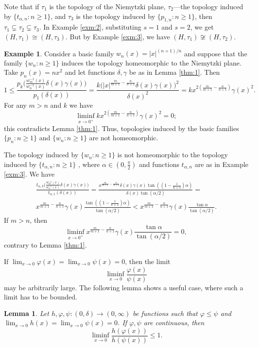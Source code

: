 \documentclass[a4paper,12pt,leqno]{amsart}
\renewcommand{\phi}{\varphi}
\newtheorem{lem}[thm]{Lemma}
\theoremstyle{definition}
\newtheorem{exm}{Example}
\renewcommand{\geq}{\geqslant}
\renewcommand{\leq}{\leqslant}
\begin{document}
Note that if $\tau_1$ is the topology of the Niemytzki plane, $\tau_2$---the topology induced by  $\{t_{\alpha,n}\colon n\geq1\}$, and $\tau_3$ is the topology induced by $\{p_{1,n}\colon n\geq1\}$, then $\tau_1\subsetneq\tau_2\subsetneq \tau_3$.
In Example \ref{exm:2}, substituting $s=1$ and $s=2$, we get $(H,\tau_1)\cong (H,\tau_3)$.
But by Example \ref{exm:3}, we have $(H,\tau_1)\not\cong(H,\tau_2)$.

\begin{exm}
  Consider a basic family $w_n(x)=|x|^{(n+1)/n}$ and  suppose that the family $\{w_n\colon n\geq 1\}$ induces the topology homeomorphic to the Niemytzki plane.
Take  $p_n(x)=nx^2$ and let functions $\delta,\gamma$ be as in Lemma \ref{thm:1}.
 Then $$1\leq\frac{p_k\big(\frac{w_m^{-1}(x)}{w_n^{-1}(x)}\delta(x)\gamma(x)\big)}{p_1(\delta(x))}=\frac{k\big(|x|^{\frac m{m+1}-\frac n{n+1}}\delta(x)\gamma(x)\big)^2}{\delta(x)^2}=kx^{2(\frac m{m+1}-\frac n{n+1})}\gamma(x)^2.$$
 For any $m>n$ and $k$ we have
 $$\liminf_{x\to 0^+}kx^{2(\frac m{m+1}-\frac n{n+1})}\gamma(x)^2=0;$$
 this contradicts Lemma \ref{thm:1}.
 Thus, topologies induced by the basic families $\{p_n\colon n\geq 1\}$ and $\{w_n\colon n\geq 1\}$ are not homeomorphic.
 
 The topology induced by $\{w_n\colon n\geq 1\}$ is not homeomorphic to the topology induced by $\{t_{\alpha,n}\colon n\geq 1\}$ , where $\alpha\in(0,\frac\pi2)$ and functions $t_{\alpha,n}$ are as in Example \ref{exm:3}.
 We have
\begin{multline*}  \frac{t_{\alpha,k}\big(\frac{w_m^{-1}(x)}{w_n^{-1}(x)}\delta(x)\gamma(x)\big)}{t_{\alpha,1}(\delta(x))}=\frac{x^{\frac m{m+1}-\frac n{n+1}}\delta(x)\gamma(x)\tan((1-\frac1{k+1})\alpha)}{\delta(x)\tan(\alpha/2)}=\\
  x^{\frac m{m+1}-\frac n{n+1}}\gamma(x)\frac{\tan((1-\frac1{k+1})\alpha)}{\tan(\alpha/2)}<x^{\frac m{m+1}-\frac n{n+1}}\gamma(x)\frac{\tan\alpha}{\tan(\alpha/2)}.
\end{multline*}
If $m>n$, then
$$\liminf_{x\to 0^+}x^{\frac m{m+1}-\frac n{n+1}}\gamma(x)\frac{\tan\alpha}{\tan(\alpha/2)}=0,$$
contrary to Lemma \ref{thm:1}.
  \end{exm}



  If $\lim_{x\to 0}\phi(x)=\lim_{x\to 0}\psi(x)=0$, then the limit  $$\liminf_{x\to 0}\frac{\phi(x)}{\psi(x)}$$ may be arbitrarily large.
The following lemma shows a useful case, where such a limit has to be bounded.
  
\begin{lem}\label{lem:1}
  Let  $h,\phi,\psi\colon(0,\delta)\to(0,\infty)$ be functions such that  $\phi\leq\psi$ and $\lim_{x\to 0}h(x)=\lim_{x\to 0}\psi(x)=0$.
  If $\phi,\psi$ are continuous, then
  $$\liminf_{x\to 0}\frac{h(\phi(x))}{h(\psi(x))}\leq 1.$$
\end{lem}
\end{document}
